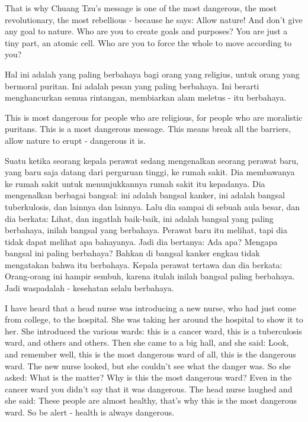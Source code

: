 \english
That is why Chuang Tzu's message is one of the most dangerous, the most revolutionary, the most rebellious - because he says: Allow nature! And don't give any goal to nature. Who are you to create goals and purposes? You are just a tiny part, an atomic cell. Who are you to force the whole to move according to you?

\bahasa
Hal ini adalah yang paling berbahaya bagi orang yang religius, untuk orang yang bermoral puritan. Ini adalah pesan yang paling berbahaya. Ini berarti menghancurkan semua rintangan, membiarkan alam meletus - itu berbahaya.

\english
This is most dangerous for people who are religious, for people who are moralistic puritans. This is a most dangerous message. This means break all the barriers, allow nature to erupt - dangerous it is.

\bahasa
Suatu ketika seorang kepala perawat sedang mengenalkan seorang perawat baru, yang baru saja datang dari perguruan tinggi, ke rumah sakit. Dia membawanya ke rumah sakit untuk menunjukkannya rumah sakit itu kepadanya. Dia mengenalkan berbagai bangsal: ini adalah bangsal kanker, ini adalah bangsal tuberkulosis, dan lainnya dan lainnya. Lalu dia sampai di sebuah aula besar, dan dia berkata: Lihat, dan ingatlah baik-baik, ini adalah bangsal yang paling berbahaya, inilah bangsal yang berbahaya. Perawat baru itu melihat, tapi dia tidak dapat melihat apa bahayanya. Jadi dia bertanya: Ada apa? Mengapa bangsal ini paling berbahaya? Bahkan di bangsal kanker engkau tidak mengatakan bahwa itu berbahaya. Kepala perawat tertawa dan dia berkata: Orang-orang ini hampir sembuh, karena itulah inilah bangsal paling berbahaya. Jadi waspadalah - kesehatan selalu berbahaya.

\english
I have heard that a head nurse was introducing a new nurse, who had just come from college, to the hospital. She was taking her around the hospital to show it to her. She introduced the various wards: this is a cancer ward, this is a tuberculosis ward, and others and others. Then she came to a big hall, and she said: Look, and remember well, this is the most dangerous ward of all, this is the dangerous ward. The new nurse looked, but she couldn't see what the danger was. So she asked: What is the matter? Why is this the most dangerous ward? Even in the cancer ward you didn't say that it was dangerous. The head nurse laughed and she said: These people are almost healthy, that's why this is the most dangerous ward. So be alert - health is always dangerous.

